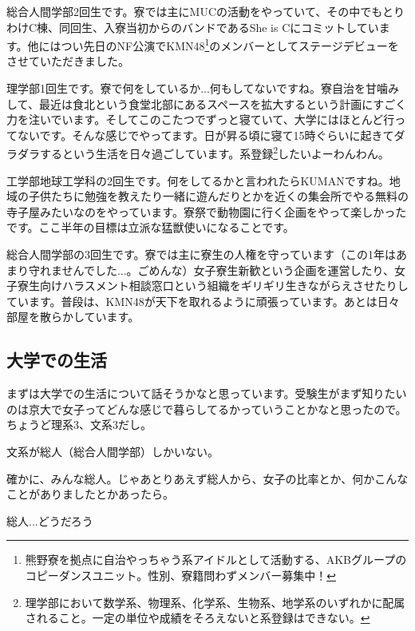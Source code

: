 \begin{multicols}{2}
  総合人間学部2回生です。寮では主にMUCの活動をやっていて、その中でもとりわけC棟、同回生、入寮当初からのバンドであるShe is Cにコミットしています。他にはつい先日のNF公演でKMN48\footnote{熊野寮を拠点に自治やっちゃう系アイドルとして活動する、AKBグループのコピーダンスユニット。性別、寮籍問わずメンバー募集中！}のメンバーとしてステージデビューをさせていただきました。



  理学部1回生です。寮で何をしているか...何もしてないですね。寮自治を甘噛みして、最近は食北という食堂北部にあるスペースを拡大するという計画にすごく力を注いでいます。そしてこのこたつでずっと寝ていて、大学にはほとんど行ってないです。そんな感じでやってます。日が昇る頃に寝て15時ぐらいに起きてダラダラするという生活を日々過ごしています。系登録\footnote{理学部において数学系、物理系、化学系、生物系、地学系のいずれかに配属されること。一定の単位や成績をそろえないと系登録はできない。}したいよーわんわん。



  工学部地球工学科の2回生です。何をしてるかと言われたらKUMANですね。地域の子供たちに勉強を教えたり一緒に遊んだりとかを近くの集会所でやる無料の寺子屋みたいなのをやっています。寮祭で動物園に行く企画をやって楽しかったです。ここ半年の目標は立派な猛獣使いになることです。



  総合人間学部の3回生です。寮では主に寮生の人権を守っています（この1年はあまり守れませんでした...。ごめんな）女子寮生新歓という企画を運営したり、女子寮生向けハラスメント相談窓口という組織をギリギリ生きながらえさせたりしています。普段は、KMN48が天下を取れるように頑張っています。あとは日々部屋を散らかしています。



  \subsection{大学での生活}



  まずは大学での生活について話そうかなと思っています。受験生がまず知りたいのは京大で女子ってどんな感じで暮らしてるかっていうことかなと思ったので。ちょうど理系3、文系3だし。

  文系が総人（総合人間学部）しかいない。

  確かに、みんな総人。じゃあとりあえず総人から、女子の比率とか、何かこんなことがありましたとかあったら。

  総人...どうだろう


\end{multicols}
